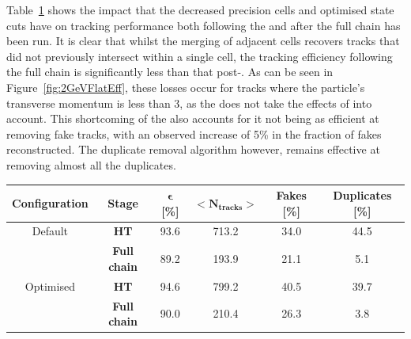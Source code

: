 Table~\ref{tab:trackFindingPerformance2GeVHT} shows the impact that the decreased precision \HT cells and optimised \KF state cuts have on tracking performance both following the \HT and after the full chain has been run.
It is clear that whilst the merging of adjacent \HT cells recovers tracks that did not previously intersect within a single \HT cell, the tracking efficiency following the full chain is significantly less than that post-\HT.
As can be seen in Figure~\ref{fig:2GeVFlatEff}, these losses occur for tracks where the particle's transverse momentum is less than 3\GeV, as the \KF does not take the effects of \MS into account.
This shortcoming of the \KF also accounts for it not being as efficient at removing fake tracks, with an observed increase of 5\% in the fraction of fakes reconstructed.
The duplicate removal algorithm however, remains effective at removing almost all the duplicates.

\begin{table}[htbp]
\label{tab:trackFindingPerformance2GeVHT}
  \centering
\begin{tabular}{cccccc}
   \hline
   \bf{Configuration} & \bf{Stage} & \bf{$\bm{\epsilon}$ [\%]} & $\bm{<N_{tracks}>}$ & \bf{Fakes [\%]} & \bf{Duplicates [\%]}  \\
        \hline
    Default & \bf{HT}     & 93.6 & 713.2 & 34.0 & 44.5 \\  
    & \bf{Full chain}     & 89.2 & 193.9 & 21.1 & 5.1 \\      
    \hline
    Optimised & \bf{HT}     & 94.6 & 799.2 & 40.5 & 39.7 \\  
    & \bf{Full chain}     & 90.0 & 210.4 & 26.3 & 3.8 \\      
   \hline
   
 \end{tabular}%
\end{table}

